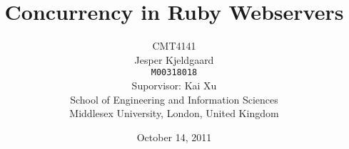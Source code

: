 \title{Concurrency in Ruby Webservers}
\author{CMT4141\\
Jesper Kjeldgaard\\
\small \texttt{M00318018}\\
\small Suporvisor: Kai Xu\\
\small School of Engineering and Information Sciences\\[-0.8ex]
\small Middlesex University, London, United Kingdom\\
}
\date{October 14, 2011}
\maketitle
